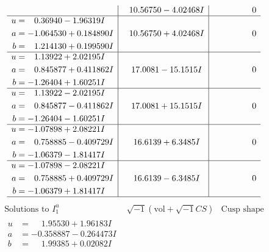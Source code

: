 \documentclass[1p]{elsarticle_modified}
\theoremstyle{definition}
\newcommand{\I}{\sqrt{-1}}
\begin{document}
$$\begin{array}{c|c|c}
 & \phantom{-}10.56750 - 4.02468 I & \phantom{-0.000000 } 0 \\ \hline\begin{aligned}
u &= \phantom{-}0.36940 - 1.96319 I \\
a &= -1.064530 + 0.184890 I \\
b &= \phantom{-}1.214130 + 0.199590 I\end{aligned}
 & \phantom{-}10.56750 + 4.02468 I & \phantom{-0.000000 } 0 \\ \hline\begin{aligned}
u &= \phantom{-}1.13922 + 2.02195 I \\
a &= \phantom{-}0.845877 + 0.411862 I \\
b &= -1.26404 + 1.60251 I\end{aligned}
 & \phantom{-}17.0081 - 15.1515 I & \phantom{-0.000000 } 0 \\ \hline\begin{aligned}
u &= \phantom{-}1.13922 - 2.02195 I \\
a &= \phantom{-}0.845877 - 0.411862 I \\
b &= -1.26404 - 1.60251 I\end{aligned}
 & \phantom{-}17.0081 + 15.1515 I & \phantom{-0.000000 } 0 \\ \hline\begin{aligned}
u &= -1.07898 + 2.08221 I \\
a &= \phantom{-}0.758885 - 0.409729 I \\
b &= -1.06379 - 1.81417 I\end{aligned}
 & \phantom{-}16.6139 + 6.3485 I & \phantom{-0.000000 } 0 \\ \hline\begin{aligned}
u &= -1.07898 - 2.08221 I \\
a &= \phantom{-}0.758885 + 0.409729 I \\
b &= -1.06379 + 1.81417 I\end{aligned}
 & \phantom{-}16.6139 - 6.3485 I & \phantom{-0.000000 } 0\\
 \hline 
 \end{array}$$\newpage$$\begin{array}{c|c|c}  
\text{Solutions to }I^u_{1}& \I (\text{vol} + \sqrt{-1}CS) & \text{Cusp shape}\\
 \hline 
\begin{aligned}
u &= \phantom{-}1.95530 + 1.96183 I \\
a &= -0.358887 - 0.264473 I \\
b &= \phantom{-}1.99385 + 0.02082 I\end{aligned}

\end{array}$$
\end{document}
